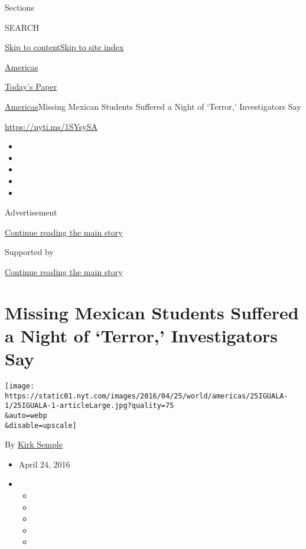 Sections

SEARCH

\protect\hyperlink{site-content}{Skip to
content}\protect\hyperlink{site-index}{Skip to site index}

\href{https://www.nytimes.com/section/world/americas}{Americas}

\href{https://myaccount.nytimes.com/auth/login?response_type=cookie\&client_id=vi}{}

\href{https://www.nytimes.com/section/todayspaper}{Today's Paper}

\href{/section/world/americas}{Americas}\textbar{}Missing Mexican
Students Suffered a Night of `Terror,' Investigators Say

\url{https://nyti.ms/1SYsySA}

\begin{itemize}
\item
\item
\item
\item
\item
\end{itemize}

Advertisement

\protect\hyperlink{after-top}{Continue reading the main story}

Supported by

\protect\hyperlink{after-sponsor}{Continue reading the main story}

\hypertarget{missing-mexican-students-suffered-a-night-of-terror-investigators-say}{%
\section{Missing Mexican Students Suffered a Night of `Terror,'
Investigators
Say}\label{missing-mexican-students-suffered-a-night-of-terror-investigators-say}}

\texttt{[image: https://static01.nyt.com/images/2016/04/25/world/americas/25IGUALA-1/25IGUALA-1-articleLarge.jpg?quality=75\\\&auto=webp\\\&disable=upscale]}

By \href{http://www.nytimes.com/by/kirk-semple}{Kirk Semple}

\begin{itemize}
\item
  April 24, 2016
\item
  \begin{itemize}
  \item
  \item
  \item
  \item
  \item
  \end{itemize}
\end{itemize}

